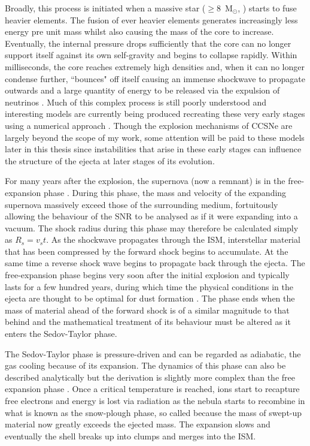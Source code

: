 Broadly, this process is initiated when a massive star ($\ge 8$~M$_{\odot}$, \citealt{Smartt2009}) starts to fuse heavier elements. The fusion of ever heavier elements generates increasingly less energy pre unit mass whilst also causing the mass of the core to increase.  Eventually, the internal pressure drops sufficiently that the core can no longer support itself against its own self-gravity and begins to collapse rapidly. Within milliseconds, the core reaches extremely high densities and, when it can no longer condense further, ``bounces" off itself causing  an immense shockwave to propagate outwards and a large quantity of energy to be released via the expulsion of neutrinos \citep{Kotake2006}.  Much of this complex process is still poorly understood and interesting models are currently being produced recreating these very early stages using a numerical approach \citep{Hammer2010,Takiwaki2014,Wongwathanarat2015}.  Though the explosion mechanisms of CCSNe are largely beyond the scope of my work, some attention will be paid to these models later in this thesis since instabilities that arise in these early stages can influence the structure of the ejecta at later stages of its evolution.

For many years after the explosion, the supernova (now a remnant) is in the free-expansion phase \citep{Landau1959,Ostriker1988}. During this phase, the mass and velocity of the expanding supernova massively exceed those of the surrounding medium, fortuitously allowing the behaviour of the SNR to be analysed as if it were expanding into a vacuum.  The shock radius during this phase may therefore be calculated simply as $R_s = v_s t$.  As the shockwave propagates through the ISM, interstellar material that has been compressed by the forward shock begins to accumulate.  At the same time a reverse shock wave begins to propagate back through the ejecta.  The free-expansion phase begins very soon after the initial explosion and typically lasts for a few hundred years, during which time the physical conditions in the ejecta are thought to be optimal for dust formation \citep{Todini2001,Bianchi2007,Cherchneff2010,Sarangi2013}.  The phase ends when the mass of material ahead of the forward shock is of a similar magnitude to that behind and the mathematical treatment of its behaviour must be altered as it enters the Sedov-Taylor phase.
 
The Sedov-Taylor phase is pressure-driven and can be regarded as adiabatic, the gas cooling because of its expansion. The dynamics of this phase can also be described analytically but the derivation is slightly more complex than the free expansion phase \citep{Taylor1950,Sedov1959}.  Once a critical temperature is reached, ions start to recapture free electrons and energy is lost via radiation as the nebula starts to recombine in what is known as the snow-plough phase, so called because the mass of swept-up material now greatly exceeds the ejected mass.  The expansion slows and eventually the shell breaks up into clumps and merges into the ISM.

